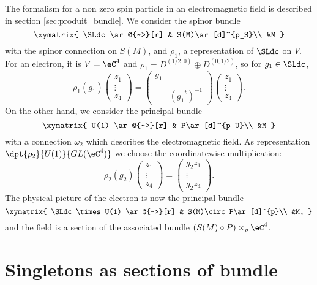 The formalism for a non zero spin particle in an electromagnetic field is described in section \ref{sec:produit_bundle}. We consider the spinor bundle
\[
\xymatrix{
    \SLdc \ar@{~>}[r] & S(M)\ar[d]^{p_S}\\ &M 
  }
\]
with the spinor connection on $S(M)$, and $\rho_1$, a representation of $\SLdc$ on $V$. For an electron, it is $V=\eC^4$ and $\rho_1=D^{(1/2,0)}\oplus D^{(0,1/2)}$, so for $g_1\in\SLdc$,
\begin{equation}
  \rho_1(g_1)\begin{pmatrix}
  z_1\\\vdots\\z_4
             \end{pmatrix}
=
\begin{pmatrix}
  g_1\\\\
&(\overline{g_1}^t)^{-1}
\end{pmatrix}
\begin{pmatrix}
  z_1\\\vdots\\z_4
             \end{pmatrix}.
\end{equation}
On the other hand, we consider the principal bundle
\[
\xymatrix{
    U(1) \ar@{~>}[r] & P\ar[d]^{p_U}\\ &M 
  }
\]
with a connection $\omega_2$ which describes the electromagnetic field. As representation $\dpt{\rho_2}{U(1)}{GL(\eC^4)}$ we choose the coordinatewise multiplication:
\begin{equation}
\rho_2(g_2)\begin{pmatrix}
  z_1\\\vdots\\z_4
             \end{pmatrix}
=
\begin{pmatrix}
  g_2z_1\\\vdots\\g_2z_4
             \end{pmatrix}.
\end{equation}
The physical picture of the electron is now the principal bundle
\[
\xymatrix{
    \SLdc\times U(1) \ar@{~>}[r] & S(M)\circ P\ar[d]^{p}\\ &M,
  }
\]
and the field is a section of the associated bundle $(S(M)\circ P)\times_{\rho}\eC^4$.

\section{Singletons as sections of bundle}
\label{SecUKPhZVd}

